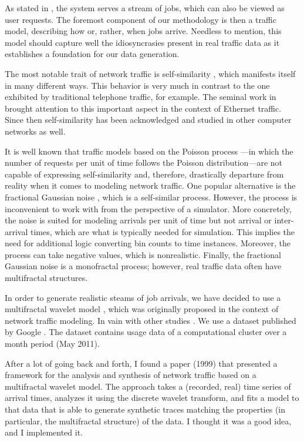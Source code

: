 As stated in , the system serves a stream of jobs,
which can also be viewed as user requests. The foremost component of our
methodology is then a traffic model, describing how or, rather, when jobs
arrive. Needless to mention, this model should capture well the idiosyncrasies
present in real traffic data as it establishes a foundation for our data
generation.

The most notable trait of network traffic is self-similarity
\cite{lifshits2014}, which manifests itself in many different ways. This
behavior is very much in contrast to the one exhibited by traditional telephone
traffic, for example. The seminal work in \cite{leland1994} brought attention to
this important aspect in the context of Ethernet  traffic. Since then
self-similarity has been acknowledged and studied in other computer networks as
well.

It is well known that traffic models based on the Poisson process
\cite{lifshits2014}---in which the number of requests per unit of time follows
the Poisson distribution---are not capable of expressing self-similarity and,
therefore, drastically departure from reality when it comes to modeling network
traffic. One popular alternative is the fractional Gaussian noise
\cite{lifshits2014}, which is a self-similar process. However, the process is
inconvenient to work with from the perspective of a simulator. More concretely,
the noise is suited for modeling arrivals per unit of time but not arrival or
inter-arrival times, which are what is typically needed for simulation. This
implies the need for additional logic converting bin counts to time instances.
Moreover, the process can take negative values, which is nonrealistic. Finally,
the fractional Gaussian noise is a monofractal process; however, real traffic
data often have multifractal structures.

In order to generate realistic steams of job arrivals, we have decided to use a
multifractal wavelet model \cite{riedi1999}, which was originally proposed in
the context of network traffic modeling. In vain with other studies
\cite{nikitovic2004}. We use a dataset published by Google \cite{google}. The
dataset contains usage data of a computational cluster over a month period (May
2011).

After a lot of going back and forth, I found a paper (1999) that presented a
framework for the analysis and synthesis of network traffic based on a
multifractal wavelet model. The approach takes a (recorded, real) time series of
arrival times, analyzes it using the discrete wavelet transform, and fits a
model to that data that is able to generate synthetic traces matching the
properties (in particular, the multifractal structure) of the data. I thought it
was a good idea, and I implemented it.


